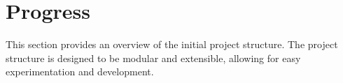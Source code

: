 \section{Progress}
This section provides an overview of the initial project structure. The project structure is designed to be modular and extensible, allowing for easy experimentation and development.









